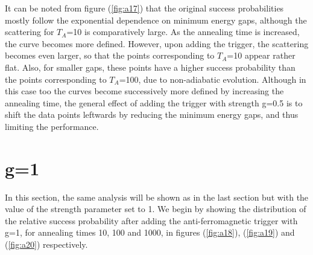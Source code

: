 \documentclass[../main.tex]{subfiles}
\begin{document}
It can be noted from figure (\ref{fig:a17}) that the original success probabilities mostly follow the exponential dependence on minimum energy gaps, although the scattering for $T_A$=10 is comparatively large. As the annealing time is increased, the curve becomes more defined. However, upon adding the trigger, the scattering becomes even larger, so that the points corresponding to $T_A$=10 appear rather flat. Also, for smaller gaps, these points have a higher success probability than the points corresponding to $T_A$=100, due to non-adiabatic evolution. Although in this case too the curves become successively more defined by increasing the annealing time, the general effect of adding the trigger with strength g=0.5 is to shift the data points leftwards by reducing the minimum energy gaps, and thus limiting the performance.



\section*{g=1}
In this section, the same analysis will be shown as in the last section but with the value of the strength parameter set to 1. We begin by showing the distribution of the relative success probability after adding the anti-ferromagnetic trigger with g=1, for annealing times 10, 100 and 1000, in figures (\ref{fig:a18}), (\ref{fig:a19}) and (\ref{fig:a20}) respectively.
\end{document}
